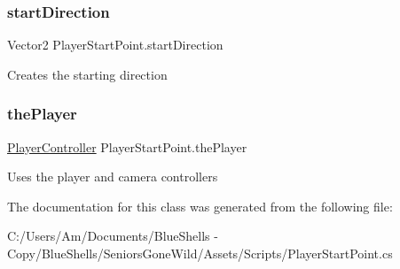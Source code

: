 \subsubsection{\texorpdfstring{start\+Direction}{startDirection}}
{\footnotesize\ttfamily Vector2 Player\+Start\+Point.\+start\+Direction}



Creates the starting direction 

\mbox{\label{class_player_start_point_a4242b06d9f40b1729a83ffb3508772c4}} 
\subsubsection{\texorpdfstring{the\+Player}{thePlayer}}
{\footnotesize\ttfamily \mbox{\hyperlink{class_player_controller}{Player\+Controller}} Player\+Start\+Point.\+the\+Player\hspace{0.3cm}{\ttfamily [private]}}



Uses the player and camera controllers 



The documentation for this class was generated from the following file\+:\begin{DoxyCompactItemize}
\item 
C\+:/\+Users/\+Am/\+Documents/\+Blue\+Shells -\/ Copy/\+Blue\+Shells/\+Seniors\+Gone\+Wild/\+Assets/\+Scripts/Player\+Start\+Point.\+cs\end{DoxyCompactItemize}
